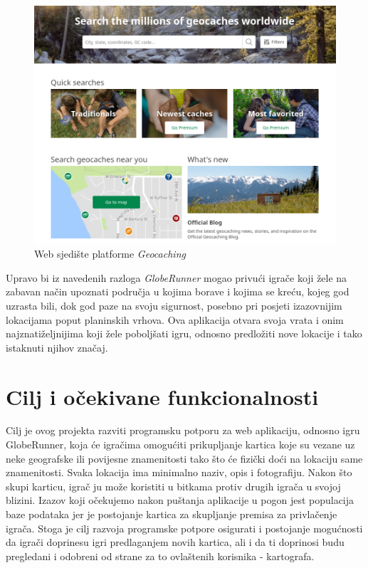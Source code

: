 		\begin{figure}[H]
			\includegraphics[width=\textwidth]{slike/Uvod/Geocaching.png} 
			\caption{Web sjedište platforme \textit{Geocaching}}
			\label{fig:geocaching}
		\end{figure}
		
		Upravo bi iz navedenih razloga \textit{GlobeRunner} mogao privući igrače koji žele na zabavan način upoznati područja u kojima borave i kojima se kreću, kojeg god uzrasta bili, dok god paze na svoju sigurnost, posebno pri posjeti izazovnijim lokacijama poput planinskih vrhova. Ova aplikacija otvara svoja vrata i onim najznatiželjnijima koji žele poboljšati igru, odnosno predložiti nove lokacije i tako istaknuti njihov značaj.
		
		\section{Cilj i očekivane funkcionalnosti}
		
		Cilj je ovog projekta razviti programsku potporu za web aplikaciju, odnosno igru GlobeRunner, koja će igračima omogućiti prikupljanje kartica koje su vezane uz neke geografske ili povijesne znamenitosti tako što će fizički doći na lokaciju same znamenitosti. Svaka lokacija ima minimalno naziv, opis i fotografiju. Nakon što skupi karticu, igrač ju može koristiti u bitkama protiv drugih igrača u svojoj blizini. Izazov koji očekujemo nakon puštanja aplikacije u pogon jest populacija baze podataka jer je postojanje kartica za skupljanje premisa za privlačenje igrača. Stoga je cilj razvoja programske potpore osigurati i postojanje mogućnosti da igrači doprinesu igri predlaganjem novih kartica, ali i da ti doprinosi budu pregledani i odobreni od strane za to ovlaštenih korisnika - kartografa.

